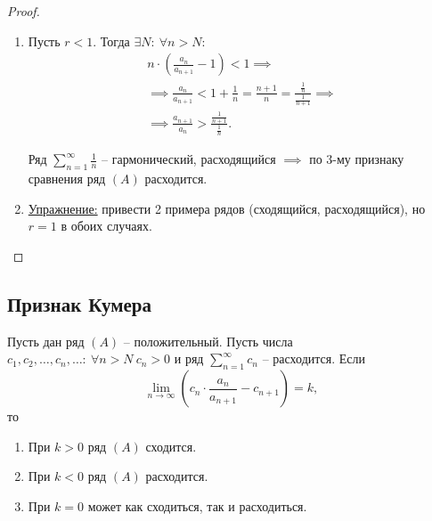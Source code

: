 \begin{proof}
\begin{enumerate}
        \item Пусть $r < 1$. Тогда $\exists N: \ \forall n > N$:
              \begin{multline*}
                  n \cdot \left(\frac{a_n}{a_{n+1}} - 1\right) < 1 \implies \\
                  \implies \frac{a_n}{a_{n+1}} < 1 + \frac{1}{n} = \frac{n+1}{n} = \frac{\frac{1}{n}}{\frac{1}{n+1}} \implies \\
                  \implies \frac{a_{n+1}}{a_n} > \frac{\frac{1}{n+1}}{\frac{1}{n}}.
              \end{multline*}

              Ряд $\sum_{n=1}^{\infty}\frac{1}{n}$ -- гармонический, расходящийся $\implies$ по 3-му признаку сравнения ряд $(A)$ расходится.

        \item \underline{Упражнение:} привести 2 примера рядов (сходящийся, расходящийся), но $r=1$ в обоих случаях.
    \end{enumerate}
\end{proof}

\subsection{Признак Кумера}

\begin{theorem}
    Пусть дан ряд $(A)$ -- положительный. Пусть числа $c_1,c_2,\ldots,c_n,\ldots: \ \forall n > N \ c_n > 0$ и ряд $\sum_{n=1}^{\infty}c_n$ -- расходится. Если
    \[
        \underset{n\rightarrow\infty}{\lim}\left(c_n \cdot \frac{a_n}{a_{n+1}} - c_{n+1}\right) = k,
    \]
    то
    \begin{enumerate}
        \item При $k > 0$ ряд $(A)$ сходится.
        \item При $k < 0$ ряд $(A)$ расходится.
        \item При $k = 0$ может как сходиться, так и расходиться.
    \end{enumerate}
\end{theorem}

